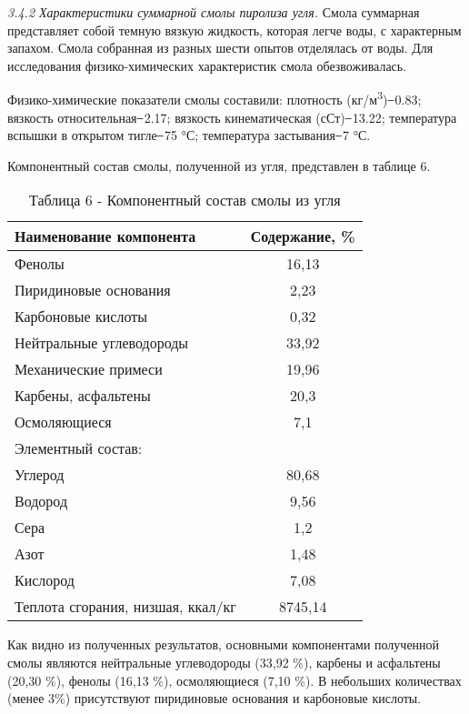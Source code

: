 \emph{3.4.2 Характеристики суммарной смолы пиролиза угля.} Смола
суммарная представляет собой темную вязкую жидкость, которая легче воды,
с характерным запахом. Смола собранная из разных шести опытов отделялась
от воды. Для исследования физико-химических характеристик смола
обезвоживалась.

Физико-химические показатели смолы составили: плотность
(кг/м\textsuperscript{3}) ̶ 0.83; вязкость относительная ̶ 2.17;
вязкость кинематическая (сСт) ̶ 13.22; температура вспышки в открытом
тигле ̶ 75 °С; температура застывания ̶ 7 °С.

Компонентный состав смолы, полученной из угля, представлен в таблице 6.

\begin{table}[H]
\caption*{Таблица 6 - Компонентный состав смолы из угля}
\centering
\begin{tabular}{|lc|}
\hline
\multicolumn{1}{|l|}{Наименование компонента} & \multicolumn{1}{l|}{Содержание, \%} \\ \hline
\multicolumn{1}{|l|}{Фенолы} & 16,13 \\ \hline
\multicolumn{1}{|l|}{Пиридиновые основания} & 2,23 \\ \hline
\multicolumn{1}{|l|}{Карбоновые кислоты} & 0,32 \\ \hline
\multicolumn{1}{|l|}{Нейтральные углеводороды} & 33,92 \\ \hline
\multicolumn{1}{|l|}{Механические примеси} & 19,96 \\ \hline
\multicolumn{1}{|l|}{Карбены, асфальтены} & 20,3 \\ \hline
\multicolumn{1}{|l|}{Осмоляющиеся} & 7,1 \\ \hline
\multicolumn{2}{|l|}{Элементный состав:} \\ \hline
\multicolumn{1}{|l|}{Углерод} & 80,68 \\ \hline
\multicolumn{1}{|l|}{Водород} & 9,56 \\ \hline
\multicolumn{1}{|l|}{Сера} & 1,2 \\ \hline
\multicolumn{1}{|l|}{Азот} & 1,48 \\ \hline
\multicolumn{1}{|l|}{Кислород} & 7,08 \\ \hline
\multicolumn{1}{|l|}{Теплота сгорания, низшая, ккал/кг} & 8745,14 \\ \hline
\end{tabular}
\end{table}

Как видно из полученных результатов, основными компонентами полученной
смолы являются нейтральные углеводороды (33,92 \%), карбены и асфальтены
(20,30 \%), фенолы (16,13 \%), осмоляющиеся (7,10 \%). В небольших
количествах (менее 3\%) присутствуют пиридиновые основания и карбоновые
кислоты.

